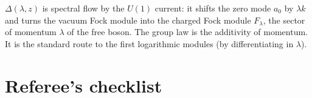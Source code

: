 \begin{physics}
$\Delta(\lambda,z)$ is spectral flow by the $U(1)$ current: it shifts the zero mode $a_0$ by $\lambda k$ and turns the vacuum Fock module
into the charged Fock module $F_\lambda$, the sector of momentum $\lambda$ of the free boson. The group law is the additivity of
momentum. It is the standard route to the first logarithmic modules (by differentiating in $\lambda$).
\end{physics}


\section{Referee's checklist}\label{l11:sec:checklist}

